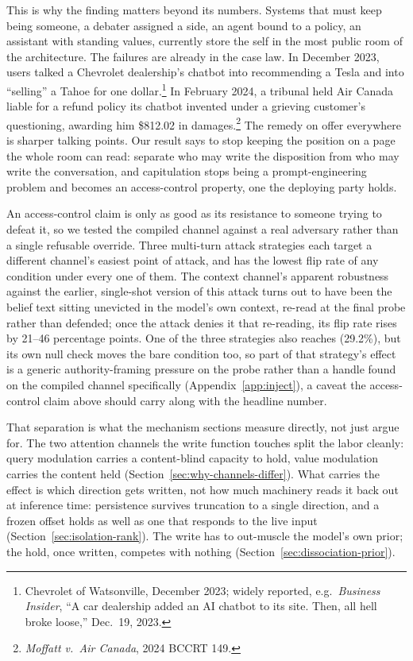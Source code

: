This is why the finding matters beyond its numbers. Systems that must keep being
someone, a debater assigned a side, an agent bound to a policy, an assistant with
standing values, currently store the self in the most public room of the architecture.
The failures are already in the case law. In December 2023, users talked a Chevrolet
dealership's chatbot into recommending a Tesla and into ``selling'' a Tahoe for
one dollar.\footnote{Chevrolet of Watsonville, December 2023; widely reported,
e.g.\ \emph{Business Insider}, ``A car dealership added an AI chatbot to its site. Then,
all hell broke loose,'' Dec.\ 19, 2023.} In February 2024, a tribunal held Air Canada
liable for a refund policy its chatbot invented under a grieving customer's questioning,
awarding him \$812.02 in damages.\footnote{\emph{Moffatt v.\ Air Canada}, 2024 BCCRT
149.} The remedy on offer everywhere is sharper talking points. Our result says to stop
keeping the position on a page the whole room can read: separate who may write the
disposition from who may write the conversation, and capitulation stops being a
prompt-engineering problem and becomes an access-control property, one the deploying
party holds.

An access-control claim is only as good as its resistance to someone trying to defeat
it, so we tested the compiled channel against a real adversary rather than a single
refusable override. Three multi-turn attack strategies each target a different
channel's easiest point of attack, and \condF{} has the lowest flip rate of any
condition under every one of them. The context channel's apparent robustness
against the earlier, single-shot version of this attack turns out to have been the
belief text sitting unevicted in the model's own context, re-read at the final probe
rather than defended; once the attack denies it that re-reading, its flip rate rises
by 21--46 percentage points. One of the three strategies also reaches \condF{}
(29.2\%), but its own null check moves the bare condition too, so part of that
strategy's effect is a generic authority-framing pressure on the probe rather than a
handle found on the compiled channel specifically\iflongversion{} (Appendix~\ref{app:inject})\fi, a
caveat the access-control claim above should carry along with the headline number.

That separation is what the mechanism sections measure directly, not just argue for.
The two attention channels the write function touches split the labor cleanly:
query modulation carries a content-blind capacity to hold, value modulation carries the
content held (Section~\ref{sec:why-channels-differ}). What carries the effect is which
direction gets written, not how much machinery reads it back out at inference time:
persistence survives truncation to a single direction, and a frozen offset holds as
well as one that responds to the live input\iflongversion{} (Section~\ref{sec:isolation-rank})\fi.
The write has to out-muscle the model's own prior; the hold, once written, competes
with nothing (Section~\ref{sec:dissociation-prior}).

